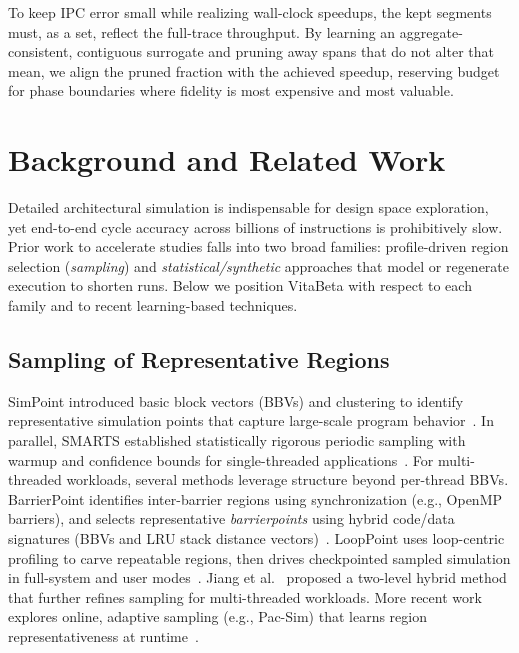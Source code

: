 \documentclass[conference]{IEEEtran}
\begin{document}
To keep IPC error small while realizing wall-clock speedups, the kept segments must, as a set, reflect the full-trace throughput. By learning an aggregate-consistent, contiguous surrogate and pruning away spans that do not alter that mean, we align the pruned fraction with the achieved speedup, reserving budget for phase boundaries where fidelity is most expensive and most valuable.


\section{Background and Related Work}\label{background}

Detailed architectural simulation is indispensable for design space exploration, yet end-to-end cycle accuracy across billions of instructions is prohibitively slow. Prior work to accelerate studies falls into two broad families: profile-driven region selection (\emph{sampling}) and \emph{statistical/synthetic} approaches that model or regenerate execution to shorten runs.  Below we position VitaBeta with respect to each family and to recent learning-based techniques. 

\subsection{Sampling of Representative Regions}
SimPoint introduced basic block vectors (BBVs) and clustering to identify representative simulation points that capture large-scale program behavior~\cite{simpoint-asplos02,hamerly-per04,hamerly-jmlr06}. In parallel, SMARTS established statistically rigorous periodic sampling with warmup and confidence bounds for single-threaded applications~\cite{smarts-isca03}. For multi-threaded workloads, several methods leverage structure beyond per-thread BBVs. BarrierPoint identifies inter-barrier regions using synchronization (e.g., OpenMP barriers), and selects representative \emph{barrierpoints} using hybrid code/data signatures (BBVs and LRU stack distance vectors)~\cite{barrierpoint-ispass14}. LoopPoint uses loop-centric profiling to carve repeatable regions, then drives checkpointed sampled simulation in full-system and user modes~\cite{looppoint-hpca22}. Jiang et al.~\cite{jiang2015_taco} proposed a two-level hybrid method that further refines sampling for multi-threaded workloads. More recent work explores online, adaptive sampling (e.g., Pac-Sim) that learns region representativeness at runtime~\cite{pacsimm-taco24}. 
 
\end{document}
